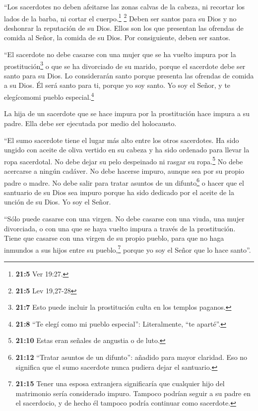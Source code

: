 ``Los sacerdotes no deben afeitarse las zonas calvas de
la cabeza, ni recortar los lados de la barba, ni cortar el
cuerpo.\footnote{\textbf{21:5} Ver 19:27.} \footnote{\textbf{21:5} Lev
  19,27-28}  Deben ser santos para su Dios y no deshonrar
la reputación de su Dios. Ellos son los que presentan las ofrendas de
comida al Señor, la comida de su Dios. Por consiguiente, deben ser
santos.

 ``El sacerdote no debe casarse con una mujer que se ha
vuelto impura por la prostitución\footnote{\textbf{21:7} Esto puede
  incluir la prostitución culta en los templos paganos.} o que se ha
divorciado de su marido, porque el sacerdote debe ser santo para su
Dios.  Lo considerarán santo porque presenta las ofrendas
de comida a su Dios. Él será santo para ti, porque yo soy santo. Yo soy
el Señor, y te elegícomomi pueblo especial.\footnote{\textbf{21:8} ``Te
  elegí como mi pueblo especial'': Literalmente, ``te aparté''.}

 La hija de un sacerdote que se hace impura por la
prostitución hace impura a su padre. Ella debe ser ejecutada por medio
del holocausto.

 ``El sumo sacerdote tiene el lugar más alto entre los
otros sacerdotes. Ha sido ungido con aceite de oliva vertido en su
cabeza y ha sido ordenado para llevar la ropa sacerdotal. No debe dejar
su pelo despeinado ni rasgar su ropa.\footnote{\textbf{21:10} Estas eran
  señales de angustia o de luto.}  No debe acercarse a
ningún cadáver. No debe hacerse impuro, aunque sea por su propio padre o
madre.  No debe salir para tratar asuntos de un
difunto\footnote{\textbf{21:12} ``Tratar asuntos de un difunto'':
  añadido para mayor claridad. Eso no significa que el sumo sacerdote
  nunca pudiera dejar el santuario.} o hacer que el santuario de su Dios
sea impuro porque ha sido dedicado por el aceite de la unción de su
Dios. Yo soy el Señor.

 ``Sólo puede casarse con una virgen.  No
debe casarse con una viuda, una mujer divorciada, o con una que se haya
vuelto impura a través de la prostitución. Tiene que casarse con una
virgen de su propio pueblo,  para que no haga inmundos a
sus hijos entre su pueblo,\footnote{\textbf{21:15} Tener una esposa
  extranjera significaría que cualquier hijo del matrimonio sería
  considerado impuro. Tampoco podrían seguir a su padre en el
  sacerdocio, y de hecho él tampoco podría continuar como sacerdote.}
porque yo soy el Señor que lo hace santo''.

